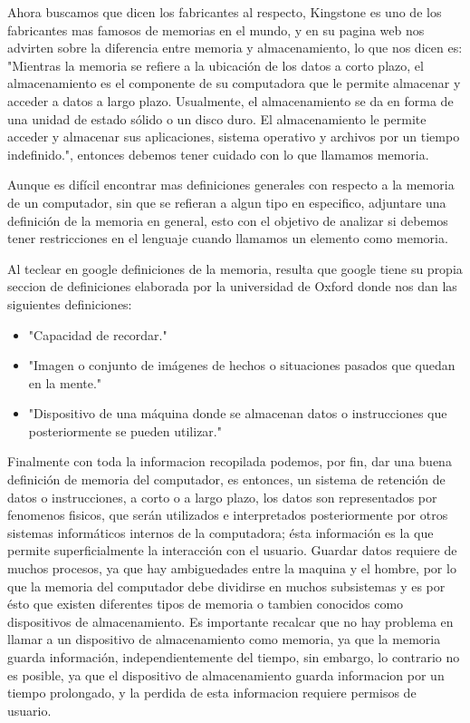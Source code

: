 \documentclass{article}
\begin{document}
Ahora buscamos que dicen los fabricantes al respecto, Kingstone es uno de los fabricantes mas famosos de memorias en el mundo, y en su pagina web nos advirten sobre la diferencia entre memoria y almacenamiento, lo que nos dicen es: "Mientras la memoria se refiere a la ubicación de los datos a corto plazo, el almacenamiento es el componente de su computadora que le permite almacenar y acceder a datos a largo plazo. Usualmente, el almacenamiento se da en forma de una unidad de estado sólido o un disco duro. El almacenamiento le permite acceder y almacenar sus aplicaciones, sistema operativo y archivos por un tiempo indefinido.", entonces debemos tener cuidado con lo que llamamos memoria.\cite{kingstone}

Aunque es difícil encontrar mas definiciones generales con respecto a la memoria de un computador, sin que se refieran a algun tipo en especifico, adjuntare una definición de la memoria en general, esto con el objetivo de analizar si debemos tener restricciones en el lenguaje cuando llamamos un elemento como memoria.

Al teclear en google definiciones de la memoria, resulta que google tiene su propia seccion de definiciones elaborada por la universidad de Oxford donde nos dan las siguientes definiciones:
\begin{itemize}
    \item
    "Capacidad de recordar."\cite{google}
    \item
    "Imagen o conjunto de imágenes de hechos o situaciones pasados que quedan en la mente."\cite{google}
    \item
    "Dispositivo de una máquina donde se almacenan datos o instrucciones que posteriormente se pueden utilizar."\cite{google}
\end{itemize}

Finalmente con toda la informacion recopilada podemos, por fin, dar una buena definición de memoria del computador, es entonces, un sistema de  retención de datos o instrucciones, a corto o a largo plazo, los datos son representados por fenomenos fisicos, que serán utilizados e interpretados posteriormente por otros sistemas informáticos internos de la computadora; ésta información es la que permite superficialmente la interacción con el usuario. Guardar datos requiere de muchos procesos, ya que hay ambiguedades entre la maquina y el hombre, por lo que la memoria del computador debe dividirse en muchos subsistemas y es por ésto que existen diferentes tipos de memoria o tambien conocidos como dispositivos de almacenamiento.
Es importante recalcar que no hay problema en llamar a un dispositivo de almacenamiento como memoria, ya que la memoria guarda información, independientemente del tiempo, sin embargo, lo contrario no es posible, ya que el dispositivo de almacenamiento guarda informacion por un tiempo prolongado, y la perdida de esta informacion requiere permisos de usuario.
\end{document}
